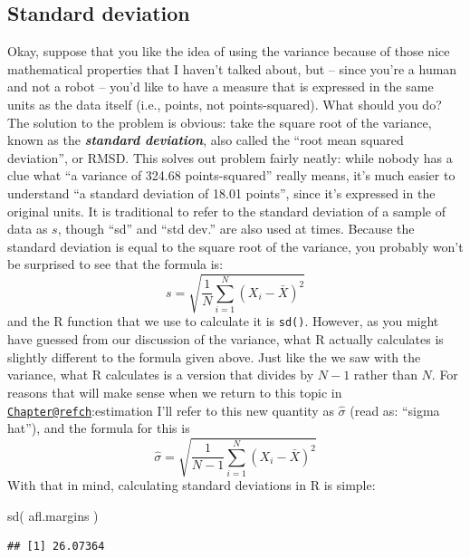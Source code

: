 \documentclass[
]{book}
\newenvironment{Shaded}{\begin{snugshade}}{\end{snugshade}}
\newcommand{\FunctionTok}[1]{\textcolor[rgb]{0.00,0.00,0.00}{#1}}
\newcommand{\NormalTok}[1]{#1}
\begin{document}
\hypertarget{sd}{%
\subsection{Standard deviation}\label{sd}}

Okay, suppose that you like the idea of using the variance because of those nice mathematical properties that I haven't talked about, but -- since you're a human and not a robot -- you'd like to have a measure that is expressed in the same units as the data itself (i.e., points, not points-squared). What should you do? The solution to the problem is obvious: take the square root of the variance, known as the \textbf{\emph{standard deviation}}, also called the ``root mean squared deviation'', or RMSD. This solves out problem fairly neatly: while nobody has a clue what ``a variance of 324.68 points-squared'' really means, it's much easier to understand ``a standard deviation of 18.01 points'', since it's expressed in the original units. It is traditional to refer to the standard deviation of a sample of data as \(s\), though ``sd'' and ``std dev.'' are also used at times. Because the standard deviation is equal to the square root of the variance, you probably won't be surprised to see that the formula is:
\[
s = \sqrt{ \frac{1}{N} \sum_{i=1}^N \left( X_i - \bar{X} \right)^2 }
\]
and the R function that we use to calculate it is \texttt{sd()}. However, as you might have guessed from our discussion of the variance, what R actually calculates is slightly different to the formula given above. Just like the we saw with the variance, what R calculates is a version that divides by \(N-1\) rather than \(N\). For reasons that will make sense when we return to this topic in \href{mailto:Chapter@refch}{\nolinkurl{Chapter@refch}}:estimation I'll refer to this new quantity as \(\hat\sigma\) (read as: ``sigma hat''), and the formula for this is
\[
\hat\sigma = \sqrt{ \frac{1}{N-1} \sum_{i=1}^N \left( X_i - \bar{X} \right)^2 }
\]
With that in mind, calculating standard deviations in R is simple:

\begin{Shaded}
\begin{Highlighting}[]
\FunctionTok{sd}\NormalTok{( afl.margins ) }
\end{Highlighting}
\end{Shaded}

\begin{verbatim}
## [1] 26.07364
\end{verbatim}
\end{document}
